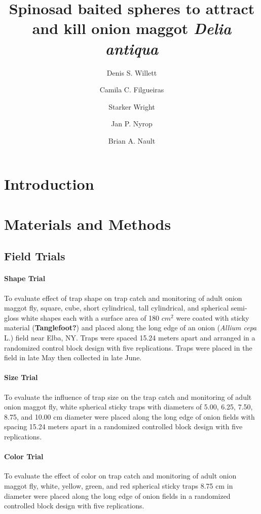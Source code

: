 \documentclass[alpha-refs]{wiley-article}
\title{Spinosad baited spheres to attract and kill onion maggot \textit{Delia antiqua}}
\author[1\authfn{1}]{Denis S. Willett}
\author[1\authfn{1}]{Camila C. Filgueiras}
\author[2]{Starker Wright}
\author[1]{Jan P. Nyrop}
\author[1]{Brian A. Nault}
\affil[1]{Department of Entomology, Cornell AgriTech, Cornell University, Geneva, NY, 14456, USA}
\affil[2]{Bartlett Tree Experts, Dublin, PA, USA}
\begin{document}
\maketitle

\begin{abstract}

\end{abstract}

\linenumbers
\section{Introduction}
\section{Materials and Methods}

\subsection{Field Trials}

\paragraph{Shape Trial} To evaluate effect of trap shape on trap catch and monitoring of adult onion maggot fly, square, cube, short cylindrical, tall cylindrical, and spherical semi-gloss white shapes each with a surface area of 180 $cm^2$  were coated with sticky material (\textbf{Tanglefoot?}) and placed along the long edge of an onion (\textit{Allium cepa} L.) field near Elba, NY.  Traps were spaced 15.24 meters apart and arranged in a randomized control block design with five replications.  Traps were placed in the field in late May then collected in late June.   

\paragraph{Size Trial}
To evaluate the influence of trap size on the trap catch and monitoring of adult onion maggot fly, white spherical sticky traps with diameters of 5.00, 6.25, 7.50, 8.75, and 10.00 cm diameter were placed along the long edge of onion fields with spacing 15.24 meters apart in a randomized controlled block design with five replications.  

\paragraph{Color Trial}
To evaluate the effect of color on trap catch and monitoring of adult onion maggot fly, white, yellow, green, and red spherical sticky traps 8.75 cm in diameter were placed along the long edge of onion fields in a randomized controlled block design with five replications.  
\end{document}
